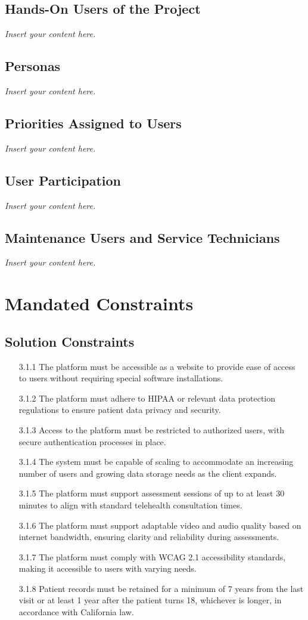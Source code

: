 \documentclass[12pt]{article}
\newcommand{\lips}{\textit{Insert your content here.}}
\begin{document}
\subsection{Hands-On Users of the Project}
\lips
\subsection{Personas}
\lips
\subsection{Priorities Assigned to Users}
\lips
\subsection{User Participation}
\lips
\subsection{Maintenance Users and Service Technicians}
\lips

\section{Mandated Constraints}
\subsection{Solution Constraints}
\begin{itemize}
  \item[3.1.1] The platform must be accessible as a website to provide ease of access to users without requiring special software installations.
  \item[3.1.2] The platform must adhere to HIPAA or relevant data protection regulations to ensure patient data privacy and security.
  \item[3.1.3] Access to the platform must be restricted to authorized users, with secure authentication processes in place.
  \item[3.1.4] The system must be capable of scaling to accommodate an increasing number of users and growing data storage needs as the client expands.
  \item[3.1.5] The platform must support assessment sessions of up to at least 30 minutes to align with standard telehealth consultation times.
  \item[3.1.6] The platform must support adaptable video and audio quality based on internet bandwidth, ensuring clarity and reliability during assessments.
  \item[3.1.7] The platform must comply with WCAG 2.1 accessibility standards, making it accessible to users with varying needs.
  \item[3.1.8] Patient records must be retained for a minimum of 7 years from the last visit or at least 1 year after the patient turns 18, whichever is 
  longer, in accordance with California law.
\end{itemize}
\end{document}
